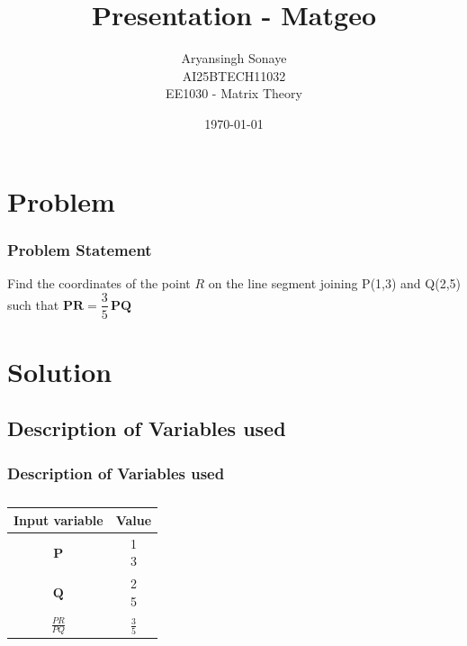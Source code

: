 \documentclass{beamer}
\title{Presentation - Matgeo}
\author{Aryansingh Sonaye \\
AI25BTECH11032 \\
EE1030 - Matrix Theory}
\date{\today}
\theoremstyle{remark}
\newcommand{\myvec}[1]{\ensuremath{\begin{pmatrix}#1\end{pmatrix}}}
\let\vec\mathbf
\numberwithin{equation}{section}
\begin{document}
\begin{frame}
\titlepage
\end{frame}

\section{Problem}
\begin{frame}
\frametitle{Problem Statement}
Find the coordinates of the point \(R\) on the line segment joining
P(1,3) and Q(2,5) such that $\vec{PR}=\dfrac{3}{5}\,\vec{PQ}$
\end{frame}

\section{Solution}
\subsection{Description of Variables used}
\begin{frame}
\frametitle{Description of Variables used}
    \begin{table}[H]
\centering
\begin{tabular}[12pt]{ |c| c|}
    \hline
    \textbf{Input variable} & \textbf{Value}\\ 
    \hline
    $\vec{P}$ & \myvec{1 \\3 } \\
    \hline 
    $\vec{Q}$ & \myvec{2 \\ 5}\\
    \hline
    $\frac{PR}{PQ}$ & $\frac{3}{5}$\\
    \hline
    \end{tabular}
    \caption{
    \label{}
    }
 \end{table}


\end{frame}
\end{document}
